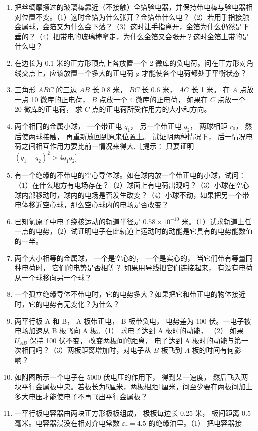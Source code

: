 \begin{enumerate}
\def\labelenumi{\arabic{enumi}.}
\item
  把丝绸摩擦过的玻璃棒靠近（不接触）全箔验电器，并保持带电棒与验电器相对位置不变。（1）这时金箔为什么张开？金箔带什么电？（2）若用手指接触金属球，金箔又为什么会下落？（3）这时让手指离开，金箔为什么仍然是下垂的？（4）把带电的玻璃棒拿走，为什么金箔又会张开？这时金箔上带的是什么电？
\item
  在边长为 0.1 米的正方形顶点上各放置一个 2
  微库的负电荷。问在正方形对角线交点上，应该放置一个多大的正电荷 g
  才能使各个电荷都处于平衡状态？
\item
  三角形 \(ABC\) 的三边 \(AB\) 长 0.8 米， \(BC\) 长 0.6 米， \(AC\) 长
  1 米。 在 \(A\) 点放一点 10 微库的正电荷， \(B\) 点放一个 4
  微库的正电荷， 如果在 \(C\) 点放一个 20 微库的正电荷， 求 \(C\)
  点的正电荷所受作用力的大小和方向。
\item
  两个相同的金属小球， 一个带正电 \(q_{1}\)， 另一个带正电 \(q_{2}\)，
  两球相距 \(r_{0}\)， 然后使两球接触， 再重新放回到原来位置上。
  试证明两种情况下，
  后一情况电荷之间相互作用力要比前一情况来得大.［提示： 只要证明
  \((q_{1} + q_{2})^{2} > 4q_{1}q_{2}]\)
\item
  有一个绝缘的不带电的空心导体球。如在球内放一个带正电的小球，试问：（1）在什么地方有电场存在？（2）球面上有电荷出现吗？（3）小球在空心球内部移动时，球内的电场是否发生改变？（4）小球不动，如果把另一个带电体移近空心球，那么空心球内的电场是否改变？
\item
  已知氢原子中电子绕核运动的轨道半径是 \(0.58 \times 10^{-10}\)
  米。（1）试求轨道上任一点的电势，（2）试证明电子在此轨道上运动时的动能是它具有的电势能数值的一半。
\item
  两个大小相等的金属球， 一个是空心的， 一个是实心的，
  当它们带有等量同种电荷时， 它们的电势是否相等？
  如果用导线把它们连接起来， 有没有电荷从一个球移向另一个球？
\item
  一个孤立绝缘导体不带电时，它的电势多大？如果把它和带正电的物体接近时，它的电势有无变化？为什么？
\item
  两平行板 A 和 B， A 板带正电， B 板带负电， 电势差为 100
  伏。一电子被电场加速从 B 板飞向 A 板。（1） 求电子达到 A 板时的动能，
  （2） 如果 \(U_{AB}\) 保持 100 伏不变， 改变两板间的距离， 电子达到 A
  板时的动能与第一次相同吗？（3）两板距离增加时，对电子从 \(B\) 板飞到
  \(A\) 板的时间有何影响？
\item
  如附图所示一个电子在 5000 伏电压的作用下， 得到某一速度，
  然后飞入两块平行金属板中央。若板长为5厘米，两板相距1厘米，间至少要在两板间加上多大电压才能使电子不再飞出平行金属板？
\item
  一平行板电容器由两块正方形极板组成， 极板每边长 0.25 米， 板间距离 0.5
  毫米。电容器浸没在相对介电常数 \(\varepsilon_{r} = 4.5\)
  的绝缘油里。（1） 把电容器接
\end{enumerate}

